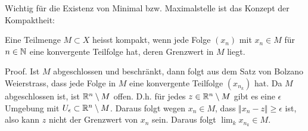 Wichtig für die Existenz von Minimal  bzw. Maximalstelle ist das Konzept der Kompaktheit:
\label{stetigkeit/eigenschaften:definition-2}
\begin{definition}{}{}



Eine Teilmenge \(M \subset X\) heisst kompakt, wenn jede Folge \((x_n)\) mit \(x_n \in M\) für \(n \in \mathbb{N}\) eine konvergente Teilfolge hat, deren Grenzwert in \(M\) liegt.
\end{definition}



\begin{emphBox}{}{}
Proof.  Ist \(M\) abgeschlossen und beschränkt, dann folgt aus dem Satz von Bolzano Weierstrass, dass jede Folge in \(M\) eine konvergente Teilfolge \((x_{n_k})\) hat. Da \(M\) abgeschlossen ist, ist \(\mathbb{R}^n \setminus M\) offen. D.h. für jedes \(z \in \mathbb{R}^n \setminus M\) gibt es eine \(\epsilon\) Umgebung mit \(U_\epsilon \subset \mathbb{R}^n \setminus M\). Daraus folgt wegen \(x_n \in M\), dass \(\Vert x_n - z \Vert \geq \epsilon\) ist, also kann \(z\) nicht der Grenzwert von \(x_n\) sein. Daraus folgt \(\lim_k x_{n_k} \in M\).


\end{emphBox}

